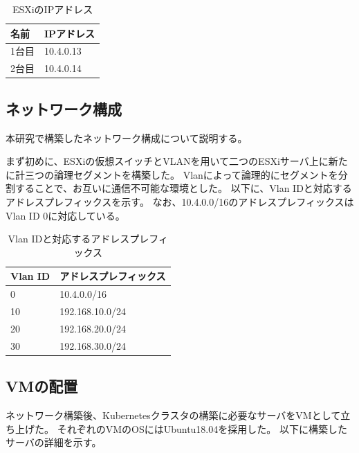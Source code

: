 \begin{table}[htb]
  \begin{center}
    \caption{ESXiのIPアドレス}
    \begin{tabular}{|l|l|} \hline
      名前 & IPアドレス \\ \hline
      1台目 & 10.4.0.13 \\ \hline
      2台目 & 10.4.0.14 \\ \hline
    \end{tabular}
  \end{center}
\end{table}

\subsection{ネットワーク構成}
\label{implementation:network-environment}

本研究で構築したネットワーク構成について説明する。

まず初めに、ESXiの仮想スイッチとVLANを用いて二つのESXiサーバ上に新たに計三つの論理セグメントを構築した。
Vlanによって論理的にセグメントを分割することで、お互いに通信不可能な環境とした。
以下に、Vlan IDと対応するアドレスプレフィックスを示す。
なお、10.4.0.0/16のアドレスプレフィックスはVlan ID 0に対応している。

\begin{table}[htb]
  \begin{center}
    \caption{Vlan IDと対応するアドレスプレフィックス}
    \begin{tabular}{|l|l|} \hline
      Vlan ID & アドレスプレフィックス \\ \hline
      0 & 10.4.0.0/16 \\ \hline
      10 & 192.168.10.0/24 \\ \hline
      20 & 192.168.20.0/24 \\ \hline
      30 & 192.168.30.0/24 \\ \hline
    \end{tabular}
  \end{center}
\end{table}

\subsection{VMの配置}

ネットワーク構築後、Kubernetesクラスタの構築に必要なサーバをVMとして立ち上げた。
それぞれのVMのOSにはUbuntu18.04を採用した。
以下に構築したサーバの詳細を示す。

